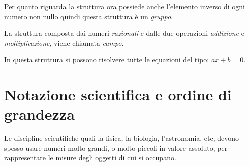 Per quanto riguarda la struttura  ora possiede anche 
l'elemento inverso di ogni numero non nullo quindi questa struttura è un 
\emph{gruppo}.

La struttura composta dai numeri \emph{razionali} e dalle due operazioni 
\emph{addizione} e \emph{moltiplicazione},  viene 
chiamata \emph{campo}.

In questa struttura si possono risolvere tutte le equazioni del tipo:
\(ax +b = 0\).

% 

\section{Notazione scientifica e ordine di grandezza}
\label{sec:razionali_notazione_scientifica}

Le discipline scientifiche quali la fisica, la biologia, l'astronomia, etc,
devono spesso usare numeri molto grandi, o molto piccoli in valore assoluto, 
per rappresentare le misure degli oggetti di cui si occupano.


